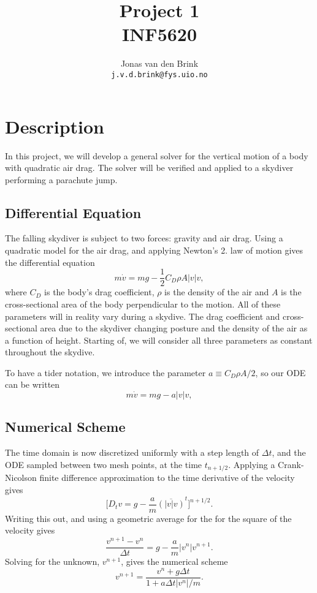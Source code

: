 \documentclass[a4paper, 11pt, notitlepage, english]{article}
\author{Jonas van den Brink \\ \texttt{j.v.d.brink@fys.uio.no}}
\title{Project 1 \\ INF5620}
\begin{document}
\maketitle


\section*{Description}

In this project, we will develop a general solver for the vertical motion of a body with quadratic air drag. The solver will be verified and applied to a skydiver performing a parachute jump.


\subsection*{Differential Equation}

The falling skydiver is subject to two forces: gravity and air drag. Using a quadratic model for the air drag, and applying Newton's 2. law of motion gives the differential equation
$$m\dot{v} = mg - \frac{1}{2}C_D \rho A |v| v,$$
where $C_D$ is the body's drag coefficient, $\rho$ is the density of the air and $A$ is the cross-sectional area of the body perpendicular to the motion. All of these parameters will in reality vary during a skydive. The drag coefficient and cross-sectional area due to the skydiver changing posture and the density of the air as a function of height. Starting of, we will consider all three parameters as constant throughout the skydive.

To have a tider notation, we introduce the parameter $a \equiv C_D \rho A /2$, so our ODE can be written
$$m\dot{v} = mg - a |v| v,$$


\subsection*{Numerical Scheme}
The time domain is now discretized uniformly with a step length of $\Delta t$, and the ODE sampled between two mesh points, at the time $t_{n+1/2}$. Applying a Crank-Nicolson finite difference approximation to the time derivative of the velocity gives
$$\big[D_t v = g - \frac{a}{m} \overline{(|v|v)}^t\big]^{n+1/2}.$$
Writing this out, and using a geometric average for the for the square of the velocity gives
$$\frac{v^{n+1} - v^n}{\Delta t} = g - \frac{a}{m}|v^n| v^{n+1}.$$
Solving for the unknown, $v^{n+1}$, gives the numerical scheme
$$v^{n+1} = \frac{v^n + g \Delta t}{1 + a \Delta t |v^n|/m}.$$
\end{document}
